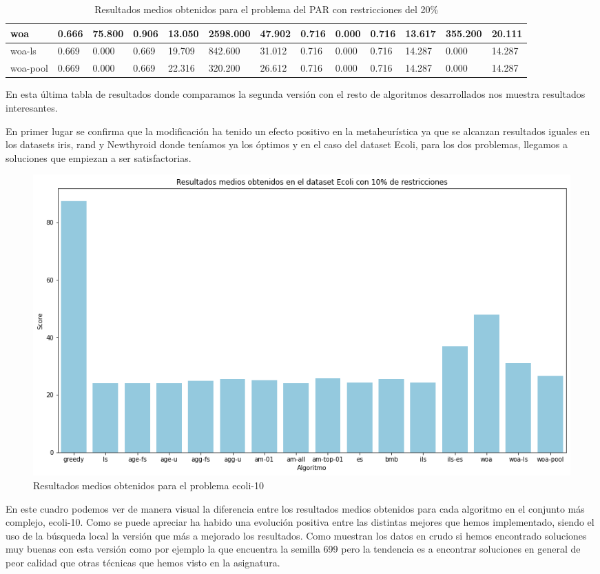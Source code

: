 \documentclass[11pt]{article}
\begin{document}
\begin{table}[H]
{\begin{tabular}{|l|l|l|l|l|l|l|l|l|l|l|l|l|}
    woa & 0.666 & 75.800  & 0.906 &  13.050 & 2598.000 & 47.902 & 0.716 & 0.000  & 0.716 &  13.617 & 355.200 & 20.111  \\ \hline
    woa-ls & 0.669 & 0.000  & 0.669 &  19.709 & 842.600  & 31.012 & 0.716 & 0.000  & 0.716 &   	14.287 & 0.000 &  	14.287  \\ \hline
    woa-pool & 0.669 & 0.000  & 0.669 &  22.316 & 320.200  & 26.612 	 & 0.716 & 0.000  & 0.716 &   	14.287 & 0.000 &  	14.287  \\ \hline
  \end{tabular}}
  \caption{Resultados medios obtenidos para el problema del PAR con restricciones del 20\%}
\end{table}

En esta última tabla de resultados donde comparamos la segunda versión con el
resto de algoritmos desarrollados nos muestra resultados interesantes. 

En primer lugar se confirma que la modificación ha tenido un efecto positivo en
la metaheurística ya que se alcanzan resultados iguales en los datasets iris,
rand y Newthyroid donde teníamos ya los óptimos y en el caso del dataset Ecoli,
para los dos problemas, llegamos a soluciones que empiezan a ser satisfactorias.

\begin{figure}[H]
  \centering
  \includegraphics[width=1\textwidth]{images/comparativa}
  \caption{Resultados medios obtenidos para el problema ecoli-10}
\end{figure}

En este cuadro podemos ver de manera visual la diferencia entre los resultados
medios obtenidos para cada algoritmo en el conjunto más complejo, ecoli-10. Como
se puede apreciar ha habido una evolución positiva entre las distintas mejores
que hemos implementado, siendo el uso de la búsqueda local la versión que más a
mejorado los resultados. Como muestran los datos en crudo si hemos encontrado
soluciones muy buenas con esta versión como por ejemplo la que encuentra la
semilla 699 pero la tendencia es a encontrar soluciones en general de peor
calidad que otras técnicas que hemos visto en la asignatura.
\end{document}

